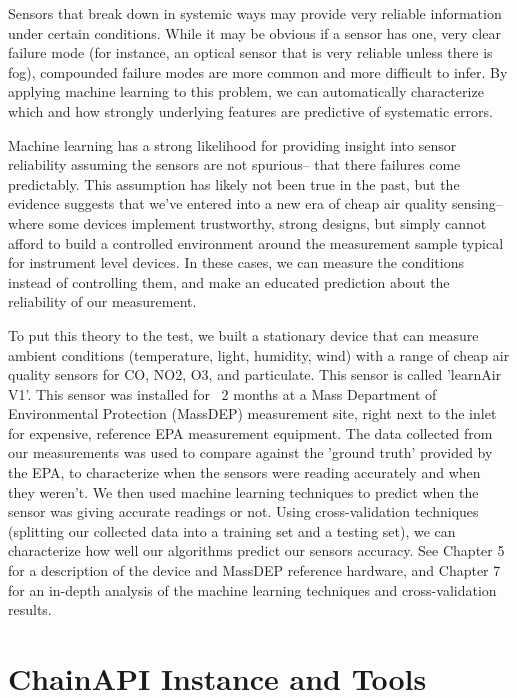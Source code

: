 Sensors that break down in systemic ways may provide very reliable information under certain conditions.  While it may be obvious if a sensor has one, very clear failure mode (for instance, an optical sensor that is very reliable unless there is fog), compounded failure modes are more common and more difficult to infer.  By applying machine learning to this problem, we can automatically characterize which and how strongly underlying features are predictive of systematic errors.  

Machine learning has a strong likelihood for providing insight into sensor reliability assuming the sensors are not spurious-- that there failures come predictably.  This assumption has likely not been true in the past, but the evidence suggests that we've entered into a new era of cheap air quality sensing-- where some devices implement trustworthy, strong designs, but simply cannot afford to build a controlled environment around the measurement sample typical for instrument level devices.  In these cases, we can measure the conditions instead of controlling them, and make an educated prediction about the reliability of our measurement.      

To put this theory to the test, we built a stationary device that can measure ambient conditions (temperature, light, humidity, wind) with a range of cheap air quality sensors for CO, NO2, O3, and particulate.  This sensor is called 'learnAir V1'.  This sensor was installed for ~2 months at a Mass Department of Environmental Protection (MassDEP) measurement site, right next to the inlet for expensive, reference EPA measurement equipment.  The data collected from our measurements was used to compare against the 'ground truth' provided by the EPA, to characterize when the sensors were reading accurately and when they weren't.  We then used machine learning techniques to predict when the sensor was giving accurate readings or not. Using cross-validation techniques (splitting our collected data into a training set and a testing set), we can characterize how well our algorithms predict our sensors accuracy.  See Chapter 5 for a description of the device and MassDEP reference hardware, and Chapter 7 for an in-depth analysis of the machine learning techniques and cross-validation results.      
 
\section{ChainAPI Instance and Tools}

